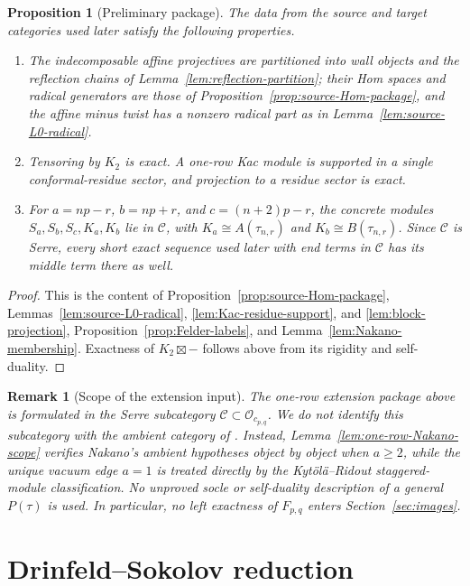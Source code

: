 \documentclass[12pt,leqno]{amsart}
\numberwithin{equation}{section}
\newtheorem{prop}[thm]{Proposition}
\newtheorem{rmk}[thm]{Remark}
\newcommand{\Oc}{\mathcal O}
\begin{document}
\begin{prop}[Preliminary package]\label{prop:preliminary-package}
The data from the source and target categories used later satisfy the
following properties.
\begin{enumerate}
\item The indecomposable affine projectives are partitioned into wall
objects and the reflection chains of Lemma~\ref{lem:reflection-partition};
their Hom spaces and radical generators are those of
Proposition~\ref{prop:source-Hom-package}, and the affine minus twist has a
nonzero radical part as in Lemma~\ref{lem:source-L0-radical}.
\item Tensoring by $K_2$ is exact.  A one-row Kac module is supported in a
single conformal-residue sector, and projection to a residue sector is exact.
\item For $a=np-r$, $b=np+r$, and $c=(n+2)p-r$, the concrete modules
$S_a,S_b,S_c,K_a,K_b$ lie in $\mathscr C$, with
$K_a\cong A(\tau_{n,r})$ and $K_b\cong B(\tau_{n,r})$.  Since
$\mathscr C$ is Serre, every short exact sequence used later with end
terms in $\mathscr C$ has its middle term there as well.
\end{enumerate}
\end{prop}

\begin{proof}
This is the content of Proposition~\ref{prop:source-Hom-package},
Lemmas~\ref{lem:source-L0-radical}, \ref{lem:Kac-residue-support}, and
\ref{lem:block-projection}, Proposition~\ref{prop:Felder-labels}, and
Lemma~\ref{lem:Nakano-membership}.  Exactness of $K_2\boxtimes-$ follows
above from its rigidity and self-duality.
\end{proof}

\begin{rmk}[Scope of the extension input]\label{rmk:dependency-boundary}
The one-row extension package above is formulated in the Serre
subcategory $\mathscr C\subset\Oc_{c_{p,q}}$.  We do not identify this
subcategory with the ambient category of \cite[Definition~3.14]{Nakano}.
Instead, Lemma~\ref{lem:one-row-Nakano-scope} verifies Nakano's ambient
hypotheses object by object when $a\ge2$, while the unique vacuum edge
$a=1$ is treated directly by the Kyt\"ol\"a--Ridout staggered-module
classification.  No unproved socle or self-duality description of a
general $P(\tau)$ is used.  In particular, no left exactness of $F_{p,q}$
enters Section~\ref{sec:images}.
\end{rmk}
\section{Drinfeld--Sokolov reduction}\label{sec:DS}
\end{document}
